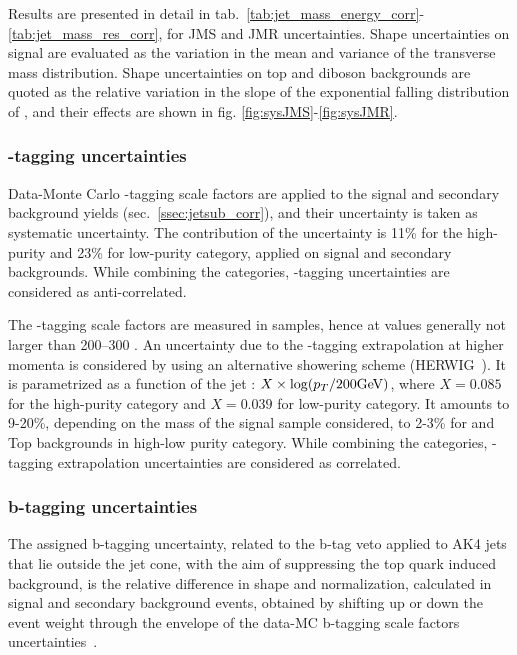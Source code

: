\noindent Results are presented in detail in tab.~\ref{tab:jet_mass_energy_corr}-\ref{tab:jet_mass_res_corr}, for JMS and JMR uncertainties. Shape uncertainties on signal are evaluated as the variation in the mean and variance of the transverse mass distribution. Shape uncertainties on top and diboson backgrounds are quoted as the relative variation in the slope of the exponential falling distribution of \mtVZ, and their effects are shown in fig. \ref{fig:sysJMS}-\ref{fig:sysJMR}.


\subsubsection{\V-tagging uncertainties}
\label{sec:wtagunc}

Data-Monte Carlo \V-tagging scale factors are applied to the signal and secondary background yields (sec.~\ref{ssec:jetsub_corr}), and their uncertainty is taken as systematic uncertainty. The contribution of the uncertainty is 11\% for the high-purity and 23\% for low-purity category, applied on signal and secondary backgrounds. While combining the categories, \V-tagging uncertainties are considered as anti-correlated.

\noindent The \V-tagging scale factors are measured in \ttbar samples, hence at \pt values generally not larger than 200--300 \GeV. An uncertainty due to the \V-tagging extrapolation at higher momenta is considered by using an alternative showering scheme (HERWIG~\cite{bib:HERWIG}). It is parametrized as a function of the jet \pt: $X \times \log(p_T/200 \text{GeV})$, where $X=0.085$ for the high-purity category and $X=0.039$ for low-purity category. It amounts to 9-20\%, depending on the mass of the signal sample considered, to 2-3\% for \VV and Top backgrounds in high-low purity category. While combining the categories, \V-tagging extrapolation uncertainties are considered as correlated.


\subsubsection{b-tagging uncertainties}
\label{sec:btagunc}
The assigned b-tagging uncertainty, related to the b-tag veto applied to AK4 jets that lie outside the \V jet cone, with the aim of suppressing the top quark induced background, is the relative difference in shape and normalization, calculated in signal and secondary background events, obtained by shifting up or down the event weight through the envelope of the data-MC b-tagging scale factors uncertainties~\cite{bib:btagsf}.

